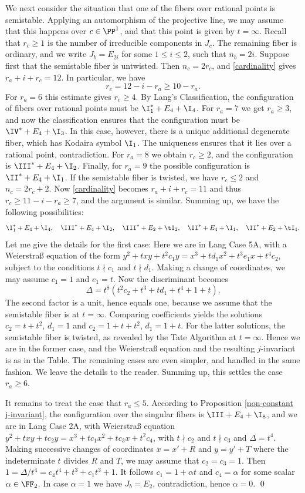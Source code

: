We next consider the situation that one of the fibers over rational points is semistable.
Applying an automorphism of the projective line, we may assume that this happens over $c\in\PP^1$,
and that this point is given by $t=\infty$. Recall that $r_c\geq 1$ is the number of irreducible components
in $J_c$. The remaining fiber is ordinary,
and we write $J_b=E_{2i}$ for some $1\leq i\leq 2$, such that $n_b=2i$.
Suppose first that the semistable fiber is untwisted.
Then $n_c=2r_c$, and \eqref{cardinality} gives $r_a+i+r_c=12$. In particular, we have
$$
r_c = 12-i-r_a\geq 10-r_a.
$$
For $r_a=6$ this estimate gives $r_c\geq 4$. By Lang's Classification, the configuration of fibers over rational points
must be $\I_1^*+E_4+\I_4$. For $r_a=7$ we get  $r_a\geq 3$, and now the classification ensures that the configuration must be $\IV^*+E_4+\I_3$.
In this case, however, there is a unique additional degenerate fiber, which has Kodaira symbol $\I_1$.
The uniqueness ensures that it lies over a rational point, contradiction.
For $r_a=8$ we obtain $r_c\geq 2$, and the configuration is $\III^*+E_4+\I_2$.
Finally, for $r_a=9$ the possible configuration is $\II^*+E_4+\I_1$.
If the semistable fiber is twisted, we have  $r_c\leq 2$ and $n_c=2r_c+2$.
Now \eqref{cardinality} becomes $r_a+i+r_c=11$ and thus $r_c\geq 11-i-r_a\geq 7$, and the argument is similar.
Summing up, we have the following possibilities:
$$
\I_1^*+E_4+\I_4,\quad \III^*+E_4+\I_2,\quad\III^*+E_2+\tI_2, \quad \II^*+E_4+\I_1,\quad \II^*+E_2+\tI_1.
$$
Let me give the details for the first case: Here we are in Lang Case 5A,
with a Weierstra\ss{} equation of the form $y^2+txy+t^2c_1y=x^3+td_1x^2+t^3e_1x+t^4c_2$,
subject to the conditions  $t\nmid c_1$ and $t\nmid d_1$.
Making a change of coordinates, we may assume $c_1=1$ and $e_1=t$.
Now the discriminant becomes
$$
\Delta=t^8(t^2c_2+t^3+td_1+t^4+1+t).
$$
The second factor is a unit, hence equals one, because we assume that the semistable fiber is at $t=\infty$.
Comparing coefficients yields the solutions  $c_2=t+t^2$, $d_1=1$ and $c_2=1+t+t^2$, $d_1=1+t$.
For the latter solutions, the semistable fiber is twisted, as revealed by the Tate Algorithm at $t=\infty$.
Hence we are in the former case, and the Weierstra\ss{} equation and the resulting $j$-invariant is as in the Table.
The remaining cases are even simpler, and handled in the same fashion. We leave the details to the reader.
Summing up, this settles the case $r_a\geq 6$.

It remains to treat the case that $r_a\leq 5$. According to Proposition \ref{non-constant j-invariant}, the configuration over
the singular fibers is $\III+E_4+\I_8$, and we are in Lang Case 2A, with Weierstra\ss{} equation
$y^2+txy + tc_2y=x^3+tc_1x^2+tc_3x+t^2c_4$, with $t\nmid c_2$ and $t\nmid c_3$ and $\Delta=t^4$.
Making successive changes  of coordinates  $x=x'+R$ and $y=y'+T$
where the indeterminate $t$ divides $R$ and $T$,
we may assume that $c_2=c_3=1$.
Then $1=\Delta/t^4=c_4t^4+t^3+c_1t^3+1$. It follows $c_1=1+\alpha t$ and $c_4=\alpha$
for some scalar $\alpha\in \FF_2$. In case $\alpha=1$ we have $J_b=E_2$, contradiction, hence $\alpha=0$.
\qed


